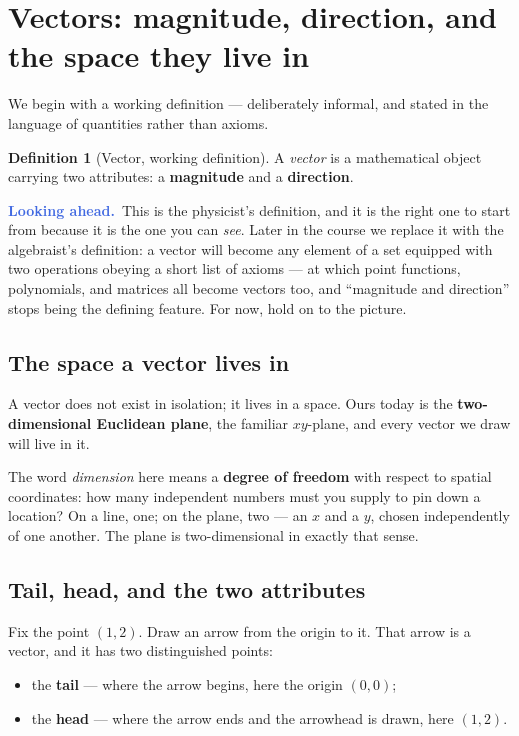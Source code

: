 \documentclass[11pt]{article}
\theoremstyle{definition}
\newtheorem{defn}{Definition}[section]
\theoremstyle{remark}
\newcommand{\lookahead}{\par\smallskip\noindent
  \textbf{\sffamily\textcolor{RoyalBlue}{Looking ahead.}}\ \ignorespaces}
\begin{document}
\section{Vectors: magnitude, direction, and the space they live in}
We begin with a working definition --- deliberately informal, and stated in the
language of quantities rather than axioms.

\begin{defn}[Vector, working definition]
A \emph{vector} is a mathematical object carrying two attributes:
a \textbf{magnitude} and a \textbf{direction}.
\end{defn}

\lookahead This is the physicist's definition, and it is the right one to start
from because it is the one you can \emph{see}. Later in the course we replace it
with the algebraist's definition: a vector will become any element of a set
equipped with two operations obeying a short list of axioms --- at which point
functions, polynomials, and matrices all become vectors too, and ``magnitude and
direction'' stops being the defining feature. For now, hold on to the picture.

\subsection*{The space a vector lives in}
A vector does not exist in isolation; it lives in a space. Ours today is the
\textbf{two-dimensional Euclidean plane}, the familiar $xy$-plane, and every
vector we draw will live in it.

The word \emph{dimension} here means a \textbf{degree of freedom} with respect
to spatial coordinates: how many independent numbers must you supply to pin down
a location? On a line, one; on the plane, two --- an $x$ and a $y$, chosen
independently of one another. The plane is two-dimensional in exactly that
sense.

\subsection*{Tail, head, and the two attributes}
Fix the point $(1,2)$. Draw an arrow from the origin to it. That arrow is a
vector, and it has two distinguished points:

\begin{itemize}[leftmargin=1.4em,itemsep=2pt]
  \item the \textbf{tail} --- where the arrow begins, here the origin $(0,0)$;
  \item the \textbf{head} --- where the arrow ends and the arrowhead is drawn,
        here $(1,2)$.
\end{itemize}
\end{document}
